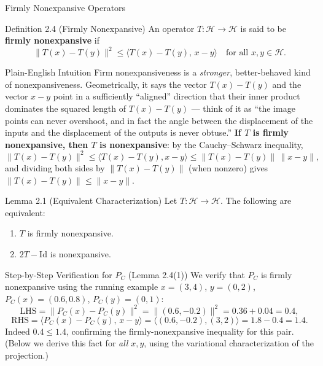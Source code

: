 \documentclass[aspectratio=169,10pt]{beamer}
\newcommand{\Id}{\mathrm{Id}}
\begin{document}
\begin{frame}[allowframebreaks]{Firmly Nonexpansive Operators}

  \begin{block}{Definition 2.4 (Firmly Nonexpansive)}
    An operator $T : \mathcal{H} \to \mathcal{H}$ is said to be
    \textbf{firmly nonexpansive} if
    \[
      \|T(x) - T(y)\|^2 \le \langle T(x) - T(y),\, x - y \rangle
      \quad \text{for all } x, y \in \mathcal{H}.
    \]
  \end{block}

  \begin{block}{Plain-English Intuition}
    Firm nonexpansiveness is a \emph{stronger}, better-behaved kind of
    nonexpansiveness. Geometrically, it says the vector $T(x)-T(y)$ and the
    vector $x-y$ point in a sufficiently ``aligned'' direction that their
    inner product dominates the squared length of $T(x)-T(y)$ --- think of
    it as ``the image points can never overshoot, and in fact the angle
    between the displacement of the inputs and the displacement of the
    outputs is never obtuse.'' \textbf{If $T$ is firmly nonexpansive, then
    $T$ is nonexpansive}: by the Cauchy--Schwarz inequality,
    \[
      \|T(x)-T(y)\|^2 \le \langle T(x)-T(y), x-y\rangle
      \le \|T(x)-T(y)\|\,\|x-y\|,
    \]
    and dividing both sides by $\|T(x)-T(y)\|$ (when nonzero) gives
    $\|T(x)-T(y)\| \le \|x-y\|$.
  \end{block}

  \framebreak

  \begin{block}{Lemma 2.1 (Equivalent Characterization)}
    Let $T : \mathcal{H} \to \mathcal{H}$. The following are equivalent:
    \begin{enumerate}
      \item[(1)] $T$ is firmly nonexpansive.
      \item[(2)] $2T - \Id$ is nonexpansive.
    \end{enumerate}
  \end{block}

  \begin{block}{Step-by-Step Verification for $P_C$ (Lemma 2.4(1))}
    We verify that $P_C$ is firmly nonexpansive using the running example
    $x=(3,4)$, $y=(0,2)$, $P_C(x)=(0.6,0.8)$, $P_C(y)=(0,1)$:
    \[
      \text{LHS} = \|P_C(x)-P_C(y)\|^2 = \|(0.6,-0.2)\|^2 = 0.36+0.04 = 0.4,
    \]
    \[
      \text{RHS} = \langle P_C(x)-P_C(y),\, x-y\rangle
       = \langle (0.6,-0.2), (3,2)\rangle = 1.8 - 0.4 = 1.4.
    \]
    Indeed $0.4 \le 1.4$, confirming the firmly-nonexpansive inequality for
    this pair. (Below we derive this fact for \emph{all} $x,y$, using the
    variational characterization of the projection.)
  \end{block}


\end{frame}
\end{document}

